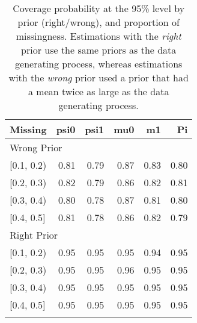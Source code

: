 \begin{table}[ht]
\centering
\begin{tabular}{lrrrrr}
  \toprule
Missing & psi0 & psi1 & mu0 & m1 & Pi \\ 
  \midrule
\multicolumn{6}{l}{Wrong Prior}\\
{[0.1, 0.2)} & 0.81 & 0.79 & 0.87 & 0.83 & 0.80 \\ 
  {[0.2, 0.3)} & 0.82 & 0.79 & 0.86 & 0.82 & 0.81 \\ 
  {[0.3, 0.4)} & 0.80 & 0.78 & 0.87 & 0.81 & 0.80 \\ 
  {[0.4, 0.5]} & 0.81 & 0.78 & 0.86 & 0.82 & 0.79 \\ 
   \midrule
\multicolumn{6}{l}{Right Prior}\\
{[0.1, 0.2)} & 0.95 & 0.95 & 0.95 & 0.94 & 0.95 \\ 
  {[0.2, 0.3)} & 0.95 & 0.95 & 0.96 & 0.95 & 0.95 \\ 
  {[0.3, 0.4)} & 0.95 & 0.95 & 0.95 & 0.95 & 0.95 \\ 
  {[0.4, 0.5]} & 0.95 & 0.95 & 0.95 & 0.95 & 0.95 \\ 
   \bottomrule
\multicolumn{6}{l}{}\\
\end{tabular}
\caption{Coverage probability at the 95\% level by prior (right/wrong), and proportion of missingness. Estimations with the \emph{right} prior use the same priors as the data generating process, whereas estimations with the \emph{wrong} prior used a prior that had a mean twice as large as the data generating process.} 
\label{tab:coverage95-method-missigness}
\end{table}
